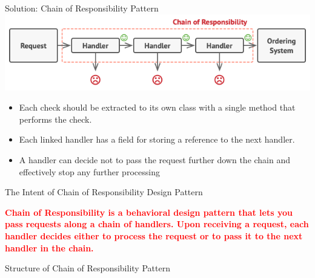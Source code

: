 \documentclass[13pt]{beamer}
\begin{document}
\begin{frame}{Solution: Chain of Responsibility Pattern}
	\includegraphics[scale=0.55]{./images/solution.png}
	\begin{itemize}
		\item Each check should be extracted to its own class with a single method that performs the check.
		\item Each linked handler has a field for storing a reference to the next handler.
		\item A handler can decide not to pass the request further down the chain and effectively stop any further processing
	\end{itemize}
\end{frame}

\begin{frame}{The Intent of Chain of Responsibility Design Pattern}
	\begin{center}
	\textcolor{red}{\textbf{Chain of Responsibility is a behavioral design pattern that lets you pass requests along a chain of handlers. Upon receiving a request, each handler decides either to process the request or to pass it to the next handler in the chain.}}\\
	\end{center}
\end{frame}

\begin{frame}{Structure of Chain of Responsibility Pattern}
	\begin{center}
	\end{center}
\end{frame}
\end{document}
